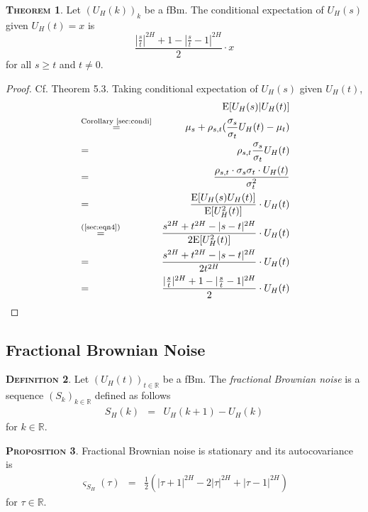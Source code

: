 \documentclass[a4paper, twoside, 11pt]{article}
\theoremstyle{definition}
\newtheorem{definition}{\scshape Definition}[section]
\newtheorem{theorem}[definition]{\scshape Theorem}
\newtheorem{proposition}[definition]{\scshape Proposition}
\begin{document}
\begin{theorem}
  Let $(U_H(k))_{k}$ be a fBm. The conditional expectation of $U_H(s)$  given $U_H(t)=x$ is
\begin{equation*}
  \frac{|\frac{s}{t}|^{2H} + 1 - |\frac{s}{t} - 1|^{2H}}{2} \cdot x
\end{equation*}
for all $ s \ge t$ and $t \neq 0$.
\end{theorem}
\begin{proof}
  Cf. \cite{mandelbrot} Theorem 5.3. Taking conditional expectation of $U_H(s)$ given $U_H(t)$,
  \begin{eqnarray*}
  &&\mathrm{E}[U_H(s)|U_H(t)]\\
  &\overset{\text{Corollary \ref{sec:condi}}}{=}& \mu_s + \rho_{s,t} (\frac{\sigma_s}{\sigma_t}U_H(t) - \mu_t)\\
  &=& \rho_{s,t}\frac{\sigma_s}{\sigma_t}U_H(t)\\
  &=& \frac{\rho_{s,t}\cdot\sigma_s\sigma_t\cdot U_H(t)}{\sigma_t^2}\\
  &=& \frac{\mathrm{E}[U_H(s)U_H(t)]}{\mathrm{E}[U_H^2(t)]} \cdot U_H(t)\\
  &\overset{\text{(\ref{sec:eqn4})}}{=}& \frac{s^{2H} + t^{2H} - |s-t|^{2H}}{2\mathrm{E}[U_H^2(t)]}\cdot U_H(t)\\
  &=&  \frac{s^{2H} + t^{2H} - |s-t|^{2H}}{2t^{2H}}\cdot U_H(t)\\
  &=& \frac{|\frac{s}{t}|^{2H} + 1 - |\frac{s}{t} - 1|^{2H}}{2} \cdot U_H(t)
  \end{eqnarray*}
\end{proof}

\subsection{Fractional Brownian Noise}
\begin{definition}
  Let $(U_H(t))_{t\in \mathbb{R}}$ be a fBm. The \emph{fractional Brownian noise} is a sequence $(S_k)_{k\in \mathbb{R}}$ defined as follows
\begin{eqnarray*}
  S_H(k) &=& U_H(k+1) - U_H(k)
\end{eqnarray*}
for $k \in \mathbb{R}$.
\end{definition}
\begin{proposition}
  Fractional Brownian noise is stationary and its autocovariance is 
  \begin{eqnarray}
	\varsigma_{S_H}(\tau) &=&  \frac{1}{2} (|\tau + 1|^{2H} - 2|\tau|^{2H} + |\tau-1|^{2H})
  \label{sec:auto}
  \end{eqnarray}
  for $\tau \in \mathbb{R}$.
\end{proposition}
\end{document}

